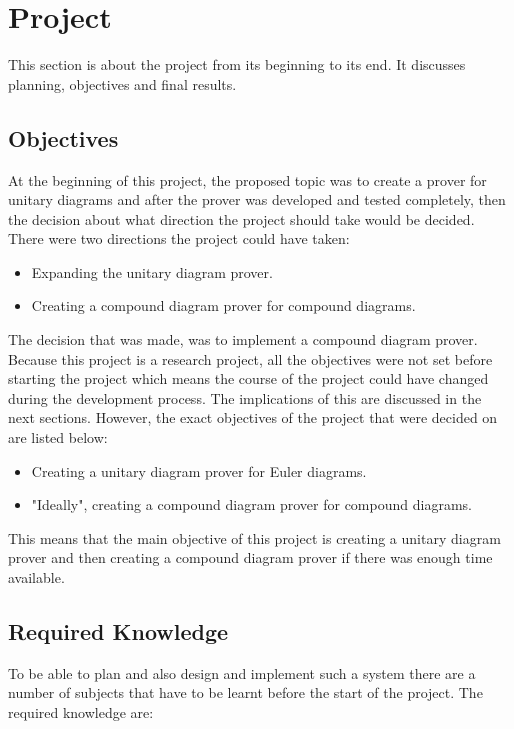 \documentclass[10pt, a4paper, titlepage]{article}
\begin{document}
\newpage 
\section{Project}
\label{sec:proj}
This section is about the project from its beginning to its end. It discusses planning, objectives and final results.

\subsection{Objectives}
At the beginning of this project, the proposed topic was to create a prover for unitary diagrams and after the prover was developed and tested completely, then the decision about what direction the project should take would be decided. There were two directions the project could have taken:

\begin{itemize}
\item Expanding the unitary diagram prover.
\item Creating a compound diagram prover for compound diagrams.
\end{itemize}

The decision that was made, was to implement a compound diagram prover. Because this project is a research project, all the objectives were not set before starting the project which means the course of the project could have changed during the development process. The implications of this are discussed in the next sections. However, the exact objectives of the project that were decided on are listed below:

\begin{itemize}
\item Creating a unitary diagram prover for Euler diagrams.
\item "Ideally", creating a compound diagram prover for compound diagrams.
\end{itemize}

This means that the main objective of this project is creating a unitary diagram prover and then creating a compound diagram prover if there was enough time available.

\subsection{Required Knowledge}
To be able to plan and also design and implement such a system there are a number of subjects that have to be learnt before the start of the project. The required knowledge are:
\end{document}
